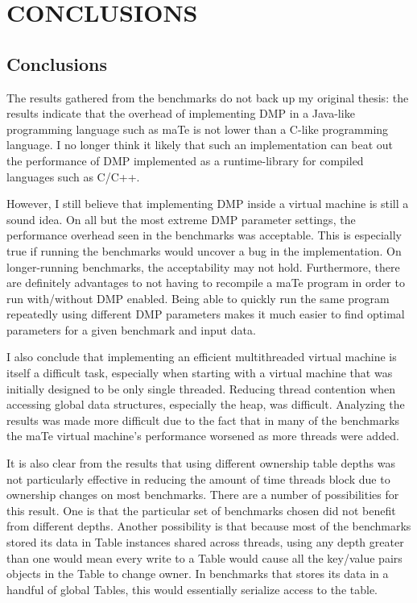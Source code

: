 \chapter{CONCLUSIONS}
\label{CONCLUSIONS}

\section{Conclusions}

The results gathered from the benchmarks do not back up my original
thesis: the results indicate that the overhead of implementing DMP in
a Java-like programming language such as maTe is not lower than a
C-like programming language.  I no longer think it likely that such an
implementation can beat out the performance of DMP implemented as a
runtime-library for compiled languages such as C/C++.


However, I still believe that implementing DMP inside a virtual
machine is still a sound idea.  On all but the most extreme DMP
parameter settings, the performance overhead seen in the benchmarks
was acceptable.  This is especially true if running the benchmarks
would uncover a bug in the implementation.  On longer-running
benchmarks, the acceptability may not hold.  Furthermore, there are
definitely advantages to not having to recompile a maTe program in
order to run with/without DMP enabled.  Being able to quickly run the
same program repeatedly using different DMP parameters makes it much
easier to find optimal parameters for a given benchmark and input
data.

I also conclude that implementing an efficient multithreaded virtual
machine is itself a difficult task, especially when starting with a
virtual machine that was initially designed to be only single
threaded.  Reducing thread contention when accessing global data
structures, especially the heap, was difficult.  Analyzing the results
was made more difficult due to the fact that in many of the benchmarks
the maTe virtual machine's performance worsened as more threads were
added.

It is also clear from the results that using different ownership table
depths was not particularly effective in reducing the amount of time
threads block due to ownership changes on most benchmarks.  There are
a number of possibilities for this result.  One is that the particular
set of benchmarks chosen did not benefit from different depths.
Another possibility is that because most of the benchmarks stored its
data in Table instances shared across threads, using any depth greater
than one would mean every write to a Table would cause all the
key/value pairs objects in the Table to change owner.  In benchmarks
that stores its data in a handful of global Tables, %
this would essentially serialize access to the table. %

